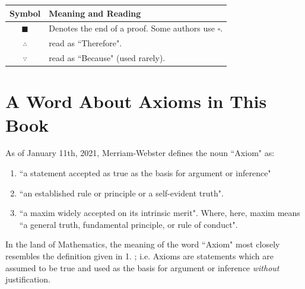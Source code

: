\begin{center}
\begin{tabular}{|c|l|}
    \hline
    \textbf{Symbol} & \textbf{Meaning and Reading} \\
    \hline
    $\blacksquare$ & Denotes the end of a proof. Some authors use $\square$. \index{$\blacksquare$}\\
    $\therefore$ & read as ``Therefore". \index{$\therefore$}\\
    $\because$ & read as ``Because" (used rarely). \index{$\because$} \\
    \hline
\end{tabular}
\end{center}
\newpage

\section{A Word About Axioms in This Book}
\label{sec:axioms}
As of January 11th, 2021, Merriam-Webster defines the noun ``Axiom" as:
\begin{enumerate}
    \item ``a statement accepted as true as the basis for argument or inference"
    \item ``an established rule or principle or a self-evident truth".
    \item ``a maxim widely accepted on its intrinsic merit". Where, here, maxim means ``a general truth, fundamental principle, or rule of conduct".
\end{enumerate}
In the land of Mathematics, the meaning of the word ``Axiom" most closely resembles the definition given in 1. ; i.e. Axioms are statements which are assumed to be true and used as the basis for argument or inference \textit{without} justification. 

